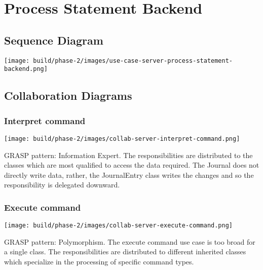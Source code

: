 \documentclass[a4paper]{report}
\begin{document}
	\pagebreak

\section{Process Statement Backend}

	\subsection{Sequence Diagram}

		\begin{center}
			\texttt{[image: build/phase-2/images/use-case-server-process-statement-backend.png]}
		\end{center}

	\subsection{Collaboration Diagrams}

		\subsubsection{Interpret command}

			\begin{center}
				\texttt{[image: build/phase-2/images/collab-server-interpret-command.png]}
			\end{center}

			GRASP pattern: Information Expert. The responsibilities are distributed to the classes which are most qualified to access the data required. The Journal does not directly write data, rather, the JournalEntry class writes the changes and so the responsibility is delegated downward.

		\subsubsection{Execute command}

			\begin{center}
				\texttt{[image: build/phase-2/images/collab-server-execute-command.png]}
			\end{center}

			GRASP pattern: Polymorphism. The execute command use case is too broad for a single class. The responsibilities are distributed to different inherited classes which specialize in the processing of specific command types.

	\pagebreak
\end{document}
